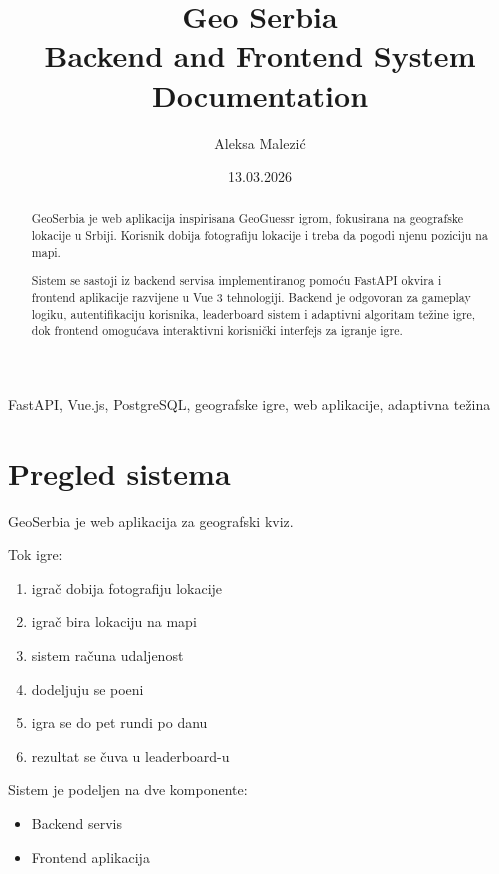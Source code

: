 \documentclass[a4paper,12pt,projekat]{etf}
\title{Geo Serbia \\ Backend and Frontend System Documentation}
\author{Aleksa Malezić}
\date{13.03.2026}
\begin{document}
\maketitle

\begin{abstract}

GeoSerbia je web aplikacija inspirisana GeoGuessr igrom,
fokusirana na geografske lokacije u Srbiji. Korisnik dobija
fotografiju lokacije i treba da pogodi njenu poziciju na mapi.

Sistem se sastoji iz backend servisa implementiranog pomoću
FastAPI okvira i frontend aplikacije razvijene u Vue 3
tehnologiji. Backend je odgovoran za gameplay logiku,
autentifikaciju korisnika, leaderboard sistem i adaptivni
algoritam težine igre, dok frontend omogućava interaktivni
korisnički interfejs za igranje igre.

\end{abstract}

\begin{keywords}

FastAPI, Vue.js, PostgreSQL, geografske igre, web aplikacije, adaptivna težina

\end{keywords}

\tableofcontents

\chapter{Pregled sistema}

GeoSerbia je web aplikacija za geografski kviz.

Tok igre:

\begin{enumerate}

\item igrač dobija fotografiju lokacije
\item igrač bira lokaciju na mapi
\item sistem računa udaljenost
\item dodeljuju se poeni
\item igra se do pet rundi po danu
\item rezultat se čuva u leaderboard-u

\end{enumerate}

Sistem je podeljen na dve komponente:

\begin{itemize}

\item Backend servis
\item Frontend aplikacija

\end{itemize}
\end{document}
